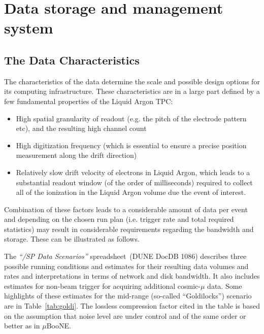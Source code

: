 \section{Data storage and management system}

\subsection{The \pd Data Characteristics}
The characteristics of the \pd data determine the scale and possible design
options for its computing infrastructure.
These characteristics are in a large part defined by a few fundamental
properties of the \pd Liquid Argon TPC:
\begin{itemize}
\item High spatial granularity of readout (e.g. the pitch of the electrode pattern etc), and the resulting high channel count
\item High digitization frequency (which is essential to ensure a precise position measurement along the drift direction)
\item Relatively slow drift velocity of electrons in Liquid Argon, which  leads to a substantial readout window (of the order of milliseconds) required to collect
all of the ionization in the Liquid Argon volume due the event of interest. 
\end{itemize}

\noindent Combination of these factors leads to a considerable amount of data per
event and depending on
the chosen run plan (i.e. trigger rate and total required statistics) may result in considerable requirements
regarding the bandwidth and storage. These can be illustrated as follows.

The \textit{``\pd/SP Data Scenarios''} spreadsheet\,\cite{data_spreadsheet}
(DUNE DocDB 1086)
describes three possible running conditions and estimates for their
resulting data volumes and rates and interpretations in terms of
network and disk bandwidth.  It also includes estimates for non-beam
trigger for acquiring additional cosmic-$\mu$ data.  Some highlights
of these estimates for the mid-range (so-called ``Goldilocks'')
scenario are in Table~\ref{tab:goldi}. The lossless compression factor cited
in the table is based on the assumption that noise level are under control
and of the same order or better as in $\mu$BooNE.

